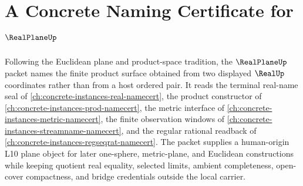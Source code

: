 \chapter{A Concrete Naming Certificate for $\RealPlaneUp$}
\label{ch:concrete-instances-real-plane-namecert}

Following the Euclidean plane and product-space tradition, the $\RealPlaneUp$ packet names the finite product surface obtained from two displayed $\RealUp$ coordinates rather than from a host ordered pair. It reads the terminal real-name seal of \autoref{ch:concrete-instances-real-namecert}, the product constructor of \autoref{ch:concrete-instances-prod-namecert}, the metric interface of \autoref{ch:concrete-instances-metric-namecert}, the finite observation windows of \autoref{ch:concrete-instances-streamname-namecert}, and the regular rational readback of \autoref{ch:concrete-instances-regseqrat-namecert}. The packet supplies a human-origin L10 plane object for later one-sphere, metric-plane, and Euclidean constructions while keeping quotient real equality, selected limits, ambient completeness, open-cover compactness, and bridge credentials outside the local carrier.

